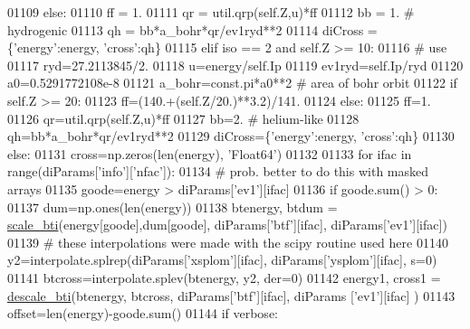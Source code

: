\begin{DoxyCode}
{{{{{{{{{{{{01109         \textcolor{keywordflow}{else}:
01110             ff = 1.
01111         qr = util.qrp(self.Z,u)*ff
01112         bb = 1.  \textcolor{comment}{# hydrogenic}
01113         qh = bb*a\_bohr*qr/ev1ryd**2
01114         diCross = \{\textcolor{stringliteral}{'energy'}:energy, \textcolor{stringliteral}{'cross'}:qh\}
01115     \textcolor{keywordflow}{elif} iso == 2 \textcolor{keywordflow}{and} self.Z >= 10:
01116         \textcolor{comment}{#  use}
01117         ryd=27.2113845/2.
01118         u=energy/self.Ip
01119         ev1ryd=self.Ip/ryd
01120         a0=0.5291772108e-8
01121         a\_bohr=const.pi*a0**2   \textcolor{comment}{# area of bohr orbit}
01122         \textcolor{keywordflow}{if} self.Z >= 20:
01123             ff=(140.+(self.Z/20.)**3.2)/141.
01124         \textcolor{keywordflow}{else}:
01125             ff=1.
01126         qr=util.qrp(self.Z,u)*ff
01127         bb=2.  \textcolor{comment}{# helium-like}
01128         qh=bb*a\_bohr*qr/ev1ryd**2
01129         diCross=\{\textcolor{stringliteral}{'energy'}:energy, \textcolor{stringliteral}{'cross'}:qh\}
01130     \textcolor{keywordflow}{else}:
01131         cross=np.zeros(len(energy), \textcolor{stringliteral}{'Float64'})
01132 
01133         \textcolor{keywordflow}{for} ifac \textcolor{keywordflow}{in} range(diParams[\textcolor{stringliteral}{'info'}][\textcolor{stringliteral}{'nfac'}]):
01134             \textcolor{comment}{# prob. better to do this with masked arrays}
01135             goode=energy > diParams[\textcolor{stringliteral}{'ev1'}][ifac]
01136             \textcolor{keywordflow}{if} goode.sum() > 0:
01137                 dum=np.ones(len(energy))
01138                 btenergy, btdum = \hyperlink{namespacepyneb_1_1utils_1_1__chianti__tools_a71b9295157832135424ea7dc0138fcd4}{scale\_bti}(energy[goode],dum[goode], diParams[\textcolor{stringliteral}{'btf'}][ifac], 
      diParams[\textcolor{stringliteral}{'ev1'}][ifac])
01139                 \textcolor{comment}{# these interpolations were made with the scipy routine used here}
01140                 y2=interpolate.splrep(diParams[\textcolor{stringliteral}{'xsplom'}][ifac], diParams[\textcolor{stringliteral}{'ysplom'}][ifac], s=0)
01141                 btcross=interpolate.splev(btenergy, y2, der=0)
01142                 energy1, cross1 = \hyperlink{namespacepyneb_1_1utils_1_1__chianti__tools_a47075ba90f01cbd7a3dbd08115544214}{descale\_bti}(btenergy, btcross, diParams[\textcolor{stringliteral}{'btf'}][ifac], diParams
      [\textcolor{stringliteral}{'ev1'}][ifac] )
01143                 offset=len(energy)-goode.sum()
01144                 \textcolor{keywordflow}{if} verbose:
}}}}}}}}}}}}
\end{DoxyCode}
